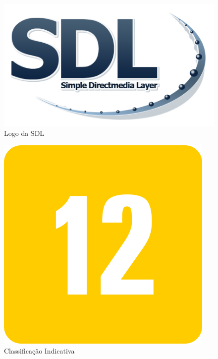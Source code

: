 \documentclass[11pt]{article} %
\begin{document}
\begin{figure}[!htp]
\centering
\includegraphics[scale=0.3]{res/Sdl-logo.png}
\caption{Logo da SDL}
\label{Logo da SDL}
\end{figure}

\begin{figure}[!htp]
\centering
\includegraphics[scale=0.3]{res/classification.png}
\caption{Classificação Indicativa}
\label{Classificação Indicativa}
\end{figure}
\end{document}
